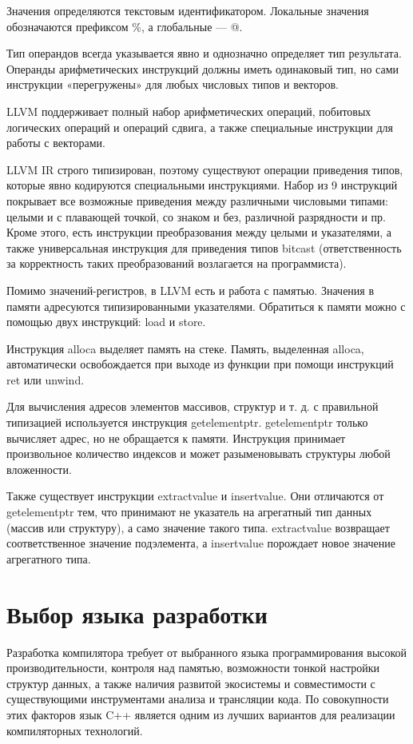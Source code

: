 Значения определяются текстовым идентификатором.
Локальные значения обозначаются префиксом \%, а глобальные — @.

Тип операндов всегда указывается явно и однозначно определяет тип результата.
Операнды арифметических инструкций должны иметь одинаковый тип, но сами инструкции «перегружены» для любых числовых типов и векторов.

LLVM поддерживает полный набор арифметических операций, побитовых логических операций и операций сдвига, а также специальные инструкции для работы с векторами.

LLVM IR строго типизирован, поэтому существуют операции приведения типов, которые явно кодируются специальными инструкциями.
Набор из 9 инструкций покрывает все возможные приведения между различными числовыми типами: целыми и с плавающей точкой, со знаком и без, различной разрядности и пр.
Кроме этого, есть инструкции преобразования между целыми и указателями, а также универсальная инструкция для приведения типов bitcast (ответственность за корректность таких преобразований возлагается на программиста).

Помимо значений-регистров, в LLVM есть и работа с памятью.
Значения в памяти адресуются типизированными указателями.
Обратиться к памяти можно с помощью двух инструкций: load и store.

Инструкция alloca выделяет память на стеке.
Память, выделенная alloca, автоматически освобождается при выходе из функции при помощи инструкций ret или unwind.

Для вычисления адресов элементов массивов, структур и т. д. с правильной типизацией используется инструкция getelementptr.
getelementptr только вычисляет адрес, но не обращается к памяти.
Инструкция принимает произвольное количество индексов и может разыменовывать структуры любой вложенности.

Также существует инструкции extractvalue и insertvalue.
Они отличаются от getelementptr тем, что принимают не указатель на агрегатный тип данных (массив или структуру), а само значение такого типа.
extractvalue возвращает соответственное значение подэлемента, а insertvalue порождает новое значение агрегатного типа.


\section{Выбор языка разработки}

Разработка компилятора требует от выбранного языка программирования высокой производительности, контроля над памятью, возможности тонкой настройки структур данных, а также наличия развитой экосистемы и совместимости с существующими инструментами анализа и трансляции кода. 
По совокупности этих факторов язык C++ является одним из лучших вариантов для реализации компиляторных технологий.


